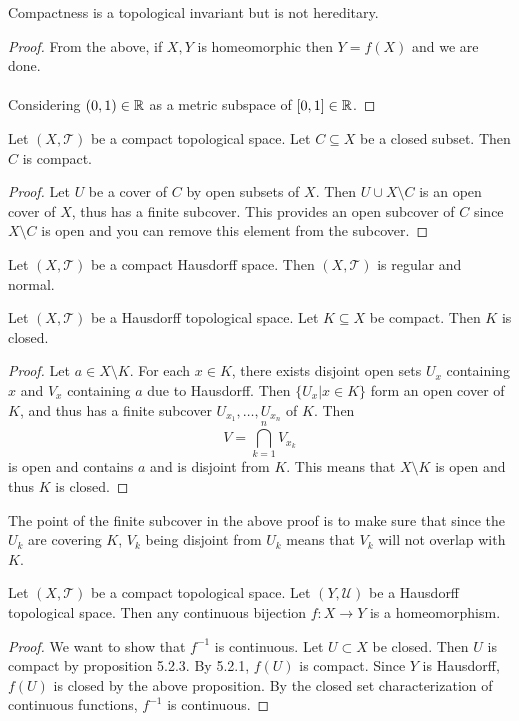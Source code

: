 \documentclass[a4paper]{article}
\begin{document}
\begin{lmm}{}{} Compactness is a topological invariant but is not hereditary. \tcbline
\begin{proof}
From the above, if $X,Y$ is homeomorphic then $Y=f(X)$ and we are done. \\~\\
Considering $(0,1)\in\mathbb{R}$ as a metric subspace of $[0,1]\in\mathbb{R}$. 
\end{proof}
\end{lmm}

\begin{prp}{}{} Let $(X,\mathcal{T})$ be a compact topological space. Let $C\subseteq X$ be a closed subset. Then $C$ is compact. \tcbline
\begin{proof}
Let $U$ be a cover of $C$ by open subsets of $X$. Then $U\cup X\setminus C$ is an open cover of $X$, thus has a finite subcover. This provides an open subcover of $C$ since $X\setminus C$ is open and you can remove this element from the subcover. 
\end{proof}
\end{prp}

\begin{prp}{}{} Let $(X,\mathcal{T})$ be a compact Hausdorff space. Then $(X,\mathcal{T})$ is regular and normal. 
\end{prp}

\begin{prp}{}{} Let $(X,\mathcal{T})$ be a Hausdorff topological space. Let $K\subseteq X$ be compact. Then $K$ is closed. \tcbline
\begin{proof}
Let $a\in X\setminus K$. For each $x\in K$, there exists disjoint open sets $U_x$ containing $x$ and $V_x$ containing $a$ due to Hausdorff. Then $\{U_x|x\in K\}$ form an open cover of $K$, and thus has a finite subcover $U_{x_1},\dots,U_{x_n}$ of $K$. Then $$V=\bigcap_{k=1}^nV_{x_k}$$ is open and contains $a$ and is disjoint from $K$. This means that $X\setminus K$ is open and thus $K$ is closed. 
\end{proof}
\end{prp}

The point of the finite subcover in the above proof is to make sure that since the $U_k$ are covering $K$, $V_k$ being disjoint from $U_k$ means that $V_k$ will not overlap with $K$. 

\begin{prp}{}{} Let $(X,\mathcal{T})$ be a compact topological space. Let $(Y,\mathcal{U})$ be a Hausdorff topological space. Then any continuous bijection $f:X\to Y$ is a homeomorphism. \tcbline
\begin{proof}
We want to show that $f^{-1}$ is continuous. Let $U\subset X$ be closed. Then $U$ is compact by proposition 5.2.3. By 5.2.1, $f(U)$ is compact. Since $Y$ is Hausdorff, $f(U)$ is closed by the above proposition. By the closed set characterization of continuous functions, $f^{-1}$ is continuous. 
\end{proof}
\end{prp}
\end{document}
